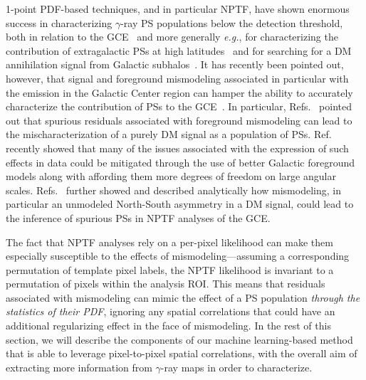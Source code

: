 \documentclass[prd,aps,10pt,nofootinbib,twocolumn,superscriptaddress,preprintnumbers,balancelastpage,longbibliography]{revtex4-1}
\begin{document}
1-point PDF-based techniques, and in particular NPTF, have shown enormous success in characterizing $\gamma$-ray PS populations below the \Fermi detection threshold, both in relation to the GCE~\cite{Lee:2015fea,Leane:2020pfc,Leane:2020nmi,Buschmann:2020adf} and more generally \emph{e.g.}, for characterizing the contribution of extragalactic PSs at high latitudes~\cite{Lisanti:2016jub} and for searching for a DM annihilation signal from Galactic subhalos~\cite{Somalwar:2020awt}. It has recently been pointed out, however, that signal and foreground mismodeling associated in particular with the emission in the Galactic Center region can hamper the ability to accurately characterize the contribution of PSs to the GCE~\cite{Leane:2019xiy,Leane:2020pfc}. In particular, Refs.~\cite{Lee:2015fea,Leane:2019xiy,Chang:2019ars} pointed out that spurious residuals associated with foreground mismodeling can lead to the mischaracterization of a purely DM signal as a population of PSs. Ref.~\cite{Buschmann:2020adf} recently showed that many of the issues associated with the expression of such effects in \Fermi data could be mitigated through the use of better Galactic foreground models along with affording them more degrees of freedom on large angular scales.
Refs.~\cite{Leane:2020pfc,Leane:2020nmi} further showed and described analytically how mismodeling, in particular an unmodeled North-South asymmetry in a DM signal, could lead to the inference of spurious PSs in NPTF analyses of the GCE. %

The fact that NPTF analyses rely on a per-pixel likelihood can make them especially susceptible to the effects of mismodeling---assuming a corresponding permutation of template pixel labels, the NPTF likelihood is invariant to a permutation of pixels within the analysis ROI. This means that residuals associated with mismodeling can mimic the effect of a PS population \emph{through the statistics of their PDF}, ignoring any spatial correlations that could have an additional regularizing effect in the face of mismodeling. In the rest of this section, we will describe the components of our machine learning-based method that is able to leverage pixel-to-pixel spatial correlations, with the overall aim of extracting more information from $\gamma$-ray maps in order to characterize.  %

\end{document}
